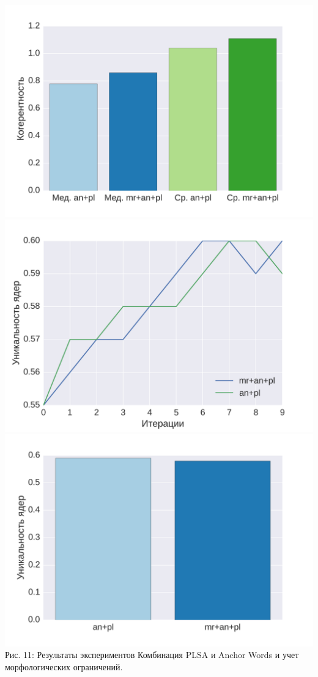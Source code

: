 \documentclass[a4paper, 14pt]{extarticle}
\begin{document}
\includegraphics[scale=0.43]{img/no/6}\\
\includegraphics[scale=0.43]{img/no/4}
\includegraphics[scale=0.43]{img/no/7}
Рис. 11: Результаты экспериментов Комбинация PLSA и Anchor Words и учет морфологических ограничений.
		
\end{document}
